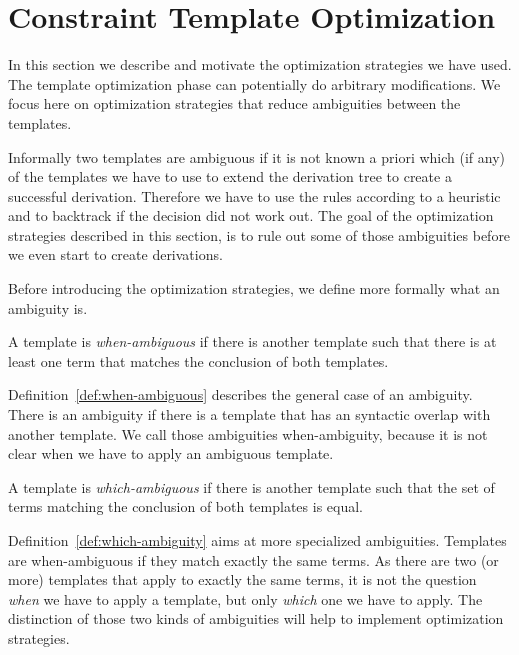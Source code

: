 \section{Constraint Template Optimization}
\label{sec:constr-templ-optim}
In this section we describe and motivate the optimization strategies
we have used. The template optimization phase can potentially do
arbitrary modifications. We focus here on optimization strategies that
reduce ambiguities between the templates.

Informally two templates are ambiguous if it is not known a priori
which (if any) of the templates we have to use to extend the
derivation tree to create a successful derivation. Therefore we have
to use the rules according to a heuristic and to backtrack if the
decision did not work out. The goal of the optimization strategies
described in this section, is to rule out some of those ambiguities
before we even start to create derivations.

Before introducing the optimization strategies, we define more
formally what an ambiguity is.

\begin{definition}
  A template is \textit{when-ambiguous} if there is another template
  such that there is at least one term that matches the conclusion of
  both templates.
\label{def:when-ambiguous}
\end{definition}

Definition~\ref{def:when-ambiguous} describes the general case of an
ambiguity. There is an ambiguity if there is a template that has an
syntactic overlap with another template. We call those ambiguities
when-ambiguity, because it is not clear when we have to apply an
ambiguous template. 

\begin{definition}
  A template is \textit{which-ambiguous} if there is another template
  such that the set of terms matching the conclusion of both templates
  is equal.
\label{def:which-ambiguity}
\end{definition}

Definition~\ref{def:which-ambiguity} aims at more specialized
ambiguities. Templates are when-ambiguous if they match exactly the
same terms. As there are two (or more) templates that apply to exactly
the same terms, it is not the question \textit{when} we have to apply
a template, but only \textit{which} one we have to apply. The
distinction of those two kinds of ambiguities will help to implement
optimization strategies.


